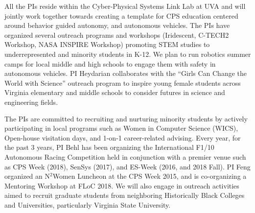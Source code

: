 All the PIs reside within the Cyber-Physical Systems Link Lab at UVA and will jointly work together towards creating a template for CPS education centered around behavior guided autonomy, and autonomous vehicles. 
\newline
{}
The PIs have organized several outreach programs and workshops (Iridescent, C-TECH2 Workshop, NASA INSPIRE Workshop) promoting STEM studies to underrepresented and minority students in K-12. 
We plan to run robotics summer camps for local middle and high schools to engage them with safety in autonomous vehicles.
PI Heydarian collaborates with the ``Girls Can Change the World with Science'' outreach program to inspire young female students across Virginia elementary and middle schools to consider futures in science and engineering fields. 

\newline
{}
The PIs are committed to recruiting and nurturing minority students by actively participating in local programs such as Women in Computer Science (WICS),  Open-house visitation days, and 1-on-1 career-related advising.
Every year, for the past 3 years, PI Behl has been organizing the International F1/10 Autonomous Racing Competition held in conjunction with a premier venue such as CPS Week (2018), SenSys (2017), and ES-Week (2016, and 2018 Fall).
PI Feng organized an N$^2$Women Luncheon at the CPS Week 2015, and is co-organizing a Mentoring Workshop at FLoC 2018. 
We will also engage in outreach activities aimed to recruit graduate students from neighboring Historically Black Colleges and Universities, particularly Virginia State University.

